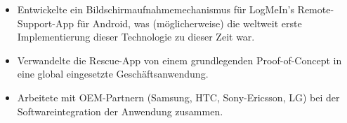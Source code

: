 \begin{itemize}
  \item Entwickelte ein Bildschirmaufnahmemechanismus für LogMeIn's Remote-Support-App für Android, was (möglicherweise) die weltweit erste Implementierung dieser Technologie zu dieser Zeit war.
  \item Verwandelte die Rescue-App von einem grundlegenden Proof-of-Concept in eine global eingesetzte Geschäftsanwendung.
  \item Arbeitete mit OEM-Partnern (Samsung, HTC, Sony-Ericsson, LG) bei der Softwareintegration der Anwendung zusammen.
\end{itemize}
\divider
